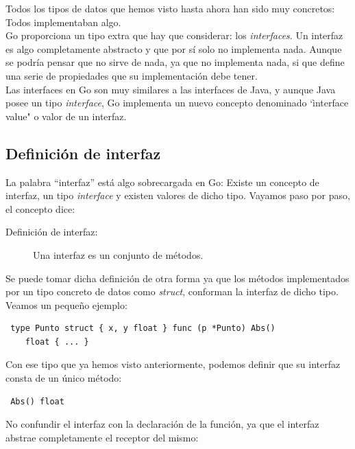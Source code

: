 	Todos los tipos de datos que hemos visto hasta ahora han sido muy concretos:
	Todos implementaban algo.\\
	
	Go proporciona un tipo extra que hay que considerar: los
	\textit{interfaces}. Un interfaz es algo completamente abstracto y que por
	sí solo no implementa nada. Aunque se podría pensar que no sirve de nada, ya
	que no implementa nada, si que define una serie de propiedades que su
	implementación debe tener.\\
	
	Las interfaces en Go son muy similares a las interfaces de Java, y aunque
	Java posee un tipo \textit{interface}, Go implementa un nuevo concepto
	denominado `ìnterface value" o valor de un interfaz.
	
	\subsection{Definición de interfaz}
	
	La palabra ``interfaz'' está algo sobrecargada en Go: Existe un concepto de
	interfaz, un tipo \textit{interface} y existen valores de dicho tipo.
	Vayamos paso por paso, el concepto dice:
	
	\begin{description} \item[Definición de interfaz:] Una interfaz es un
	conjunto de métodos.  \end{description}
	
	Se puede tomar dicha definición de otra forma ya que los métodos
	implementados por un tipo concreto de datos como \textit{struct}, conforman
	la interfaz de dicho tipo.\\
	
	Veamos un pequeño ejemplo:
	
	\begin{verbatim} type Punto struct { x, y float } func (p *Punto) Abs()
	float { ... } \end{verbatim}
	
	Con ese tipo que ya hemos visto anteriormente, podemos definir que su
	interfaz consta de un único método:
	
	\begin{verbatim} Abs() float \end{verbatim}
	
	No confundir el interfaz con la declaración de la función, ya que el
	interfaz abstrae completamente el receptor del mismo:
	
